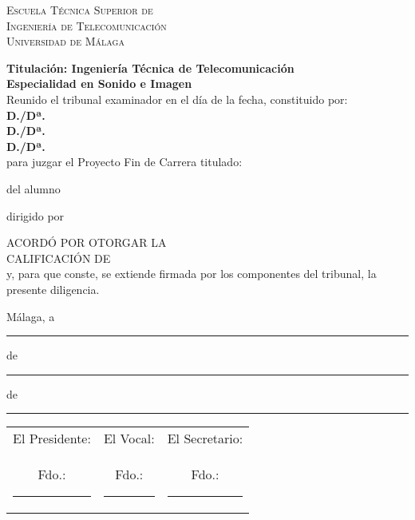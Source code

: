 \thispagestyle{empty}
\begin{center}
	\Large \sffamily \scshape %
	Escuela Técnica Superior de\\
	Ingeniería de Telecomunicación\\
	Universidad de Málaga
\end{center}

	{\bfseries \noindent Titulación: Ingeniería Técnica de Telecomunicación \\
	 Especialidad en Sonido e Imagen}\\[3ex]

	\noindent Reunido el tribunal examinador en el día de la fecha, constituido por:\\[3ex]
	\textbf{D./Dª.~}\hrulefill\\[3ex]
	\textbf{D./Dª.~}\hrulefill\\[3ex]
	\textbf{D./Dª.~}\hrulefill\\[3ex]
	
	para juzgar el Proyecto Fin de Carrera titulado:\noindent 
	
\begin{center}
	\large \bfseries \pfctitlename
\end{center}

\noindent del alumno 

\noindent dirigido por 

\bigskip

	\noindent ACORDÓ POR \hrulefill OTORGAR LA\\[3ex]%
	CALIFICACIÓN DE\hrulefill\\[3ex]
	
	
	\noindent y, para que conste, se extiende firmada por los componentes del tribunal, la presente diligencia.
	
	\bigskip

\hfill Málaga, a \rule{1cm}{0.1mm} de \rule{1cm}{0.1mm} de \rule{0.7cm}{0.1mm}

\vskip 10pt

\begin{center}
	\begin{tabular}{ccc}
	El Presidente: & El Vocal: & El Secretario:\\[2cm]
	Fdo.:\rule{3cm}{0.1mm} & Fdo.:\rule{3cm}{0.1mm} & Fdo.:\rule{3cm}{0.1mm}	
	\end{tabular}
\end{center}
\blankpage